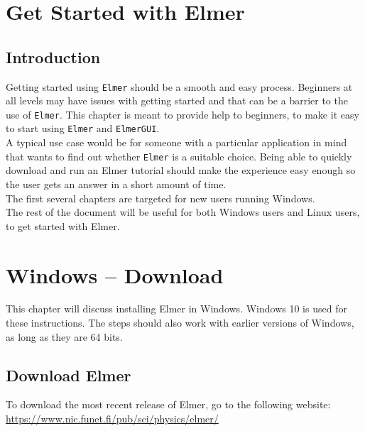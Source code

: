 \chapter{Get Started with Elmer}

\section{Introduction}

Getting started using \texttt{Elmer} should be a smooth and easy process.  Beginners at all levels may have issues with getting started and that can be a barrier to the use of  \texttt{Elmer}.  This chapter is meant to provide help to beginners, to make it easy to start using \texttt{Elmer} and \texttt{ElmerGUI}.\\

A typical use case would be for someone with a particular application in mind that wants to find out whether \texttt{Elmer} is a suitable choice.  Being able to quickly download and run an Elmer tutorial should make the experience easy enough so the user gets an answer in a short amount of time.\\

The first several chapters are targeted for new users running Windows.\\

The rest of the document will be useful for both Windows users and Linux users, to get started with Elmer.


\chapter{Windows -- Download}

This chapter will discuss installing Elmer in Windows.  Windows 10 is used for these instructions.  The steps should also work with earlier versions of Windows, as long as they are 64 bits.

\section{Download Elmer}

To download the most recent release of Elmer, go to the following website:\\

\url{https://www.nic.funet.fi/pub/sci/physics/elmer/}

